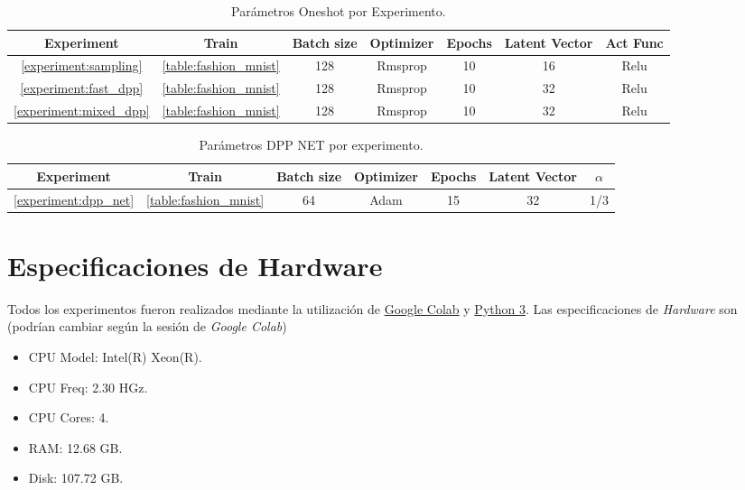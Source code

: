 \begin{appendixs}
  
  \begin{table}[h]
    \begin{tabular}{|c|c|c|c|c|c|c|}
    \hline
    Experiment & Train & Batch size & Optimizer & Epochs & Latent Vector & Act Func \\ \hline
    \ref{experiment:sampling}      & \ref{table:fashion_mnist}    & 128        & Rmsprop      & 10     & 16                & Relu         \\ \hline
    \ref{experiment:fast_dpp}      & \ref{table:fashion_mnist}    & 128        & Rmsprop      & 10     & 32                & Relu         \\ \hline
    \ref{experiment:mixed_dpp}      & \ref{table:fashion_mnist}    & 128        & Rmsprop      & 10     & 32                & Relu         \\ \hline
    
    \end{tabular}
    \caption{Parámetros Oneshot por Experimento.}
    \label{table:oneshot_parameters}
    \end{table}
    
    
    \begin{table}[h]
    \begin{tabular}{|c|c|c|c|c|c|c|}
    \hline
    Experiment & Train & Batch size & Optimizer & Epochs & Latent Vector & $\alpha$ \\ \hline
    \ref{experiment:dpp_net}      & \ref{table:fashion_mnist}    & 64       & Adam      & 15     & 32                & 1/3         \\ \hline
    
    \end{tabular}
    \caption{Parámetros DPP NET por experimento.}
    \label{table:dppnet_parameters}
    \end{table}
    
    \newpage
    
    
    \section{Especificaciones de Hardware}
    
    Todos los experimentos fueron realizados mediante la utilización de \href{https://colab.research.google.com/?hl=es}{Google Colab} y \href{https://www.python.org}{Python 3}. Las especificaciones de \textit{Hardware} son (podrían cambiar según la sesión de \textit{Google Colab})
    
    \begin{itemize}
        \item CPU Model: Intel(R) Xeon(R).
        \item CPU Freq: 2.30 HGz.
        \item CPU Cores: 4.
        \item RAM: 12.68 GB.
        \item Disk: 107.72 GB.
    \end{itemize}
    

\end{appendixs}
